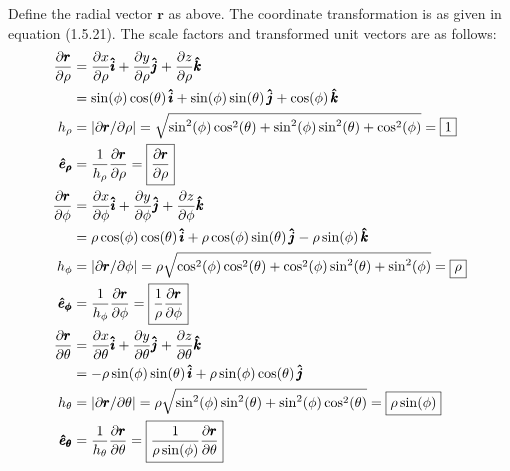 \documentclass[a4paper]{article}
\begin{document}
Define the radial vector \( \pmb{r} \) as above. The coordinate transformation is as given in equation (1.5.21). The scale factors and transformed unit vectors are as follows:
\begin{align*}
	\frac{\partial \pmb{r}}{\partial \rho} & = \frac{\partial x}{\partial \rho}\pmb{\hat{i}} + \frac{\partial y}{\partial \rho}\pmb{\hat{j}} + \frac{\partial z}{\partial \rho}\pmb{\hat{k}} \\
	 & = \sin\!\left(\phi\right)\cos\!\left(\theta\right)\pmb{\hat{i}} + \sin\!\left(\phi\right)\sin\!\left(\theta\right)\pmb{\hat{j}} + \cos\!\left(\phi\right)\pmb{\hat{k}} \\ 
	h_{\rho} & = \abs{\partial \pmb{r} / \partial \rho} = \sqrt{\sin^{2}\!\left(\phi\right)\cos^{2}\!\left(\theta\right) + \sin^{2}\!\left(\phi\right)\sin^{2}\!\left(\theta\right) + \cos^{2}\!\left(\phi\right)} = \boxed{1} \\
	\pmb{\hat{e}_{\rho}} & = \frac{1}{h_{\rho}}\frac{\partial \pmb{r}}{\partial \rho} = \boxed{\frac{\partial \pmb{r}}{\partial \rho}} \\
	\frac{\partial \pmb{r}}{\partial \phi} & = \frac{\partial x}{\partial \phi}\pmb{\hat{i}} + \frac{\partial y}{\partial \phi}\pmb{\hat{j}} + \frac{\partial z}{\partial \phi}\pmb{\hat{k}} \\
					       & = \rho \cos\!\left(\phi\right) \cos\!\left(\theta\right) \pmb{\hat{i}} + \rho \cos\!\left(\phi\right) \sin\!\left(\theta\right) \pmb{\hat{j}} - \rho \sin\!\left(\phi\right) \pmb{\hat{k}} \\
	h_{\phi} & = \abs{\partial \pmb{r} / \partial \phi} = \rho \sqrt{\cos^{2}\!\left(\phi\right) \cos^{2}\!\left(\theta\right) + \cos^{2}\!\left(\phi\right) \sin^{2}\!\left(\theta\right) + \sin^{2}\!\left(\phi\right) } = \boxed{\rho} \\
	\pmb{\hat{e}_{\phi}} & = \frac{1}{h_{\phi}}\frac{\partial \pmb{r}}{\partial \phi} = \boxed{\frac{1}{\rho}\frac{\partial \pmb{r}}{\partial \phi}} \\
	\frac{\partial \pmb{r}}{\partial \theta} & = \frac{\partial x}{\partial \theta}\pmb{\hat{i}} + \frac{\partial y}{\partial \theta}\pmb{\hat{j}} + \frac{\partial z}{\partial \theta}\pmb{\hat{k}} \\
						 & = -\rho \sin\!\left(\phi\right) \sin\!\left(\theta\right) \pmb{\hat{i}} + \rho \sin\!\left(\phi\right) \cos\!\left(\theta\right) \pmb{\hat{j}} \\
	h_{\theta} & = \abs{\partial \pmb{r} / \partial \theta} = \rho \sqrt{\sin^{2}\!\left(\phi\right) \sin^{2}\!\left(\theta\right) + \sin^{2}\!\left(\phi\right) \cos^{2}\!\left(\theta\right) } = \boxed{\rho \sin\!\left(\phi\right)} \\
	\pmb{\hat{e}_{\theta}} & = \frac{1}{h_{\theta}}\frac{\partial \pmb{r}}{\partial \theta} = \boxed{\frac{1}{\rho \sin\!\left(\phi\right)}\frac{\partial \pmb{r}}{\partial \theta}}
\end{align*}
\end{document}
